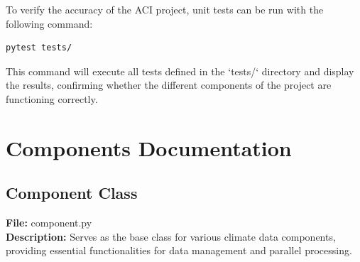 \documentclass[a4paper,12pt]{article}
\begin{document}
To verify the accuracy of the ACI project, unit tests can be run with the following command:

\begin{lstlisting}[language=bash]
pytest tests/
\end{lstlisting}

This command will execute all tests defined in the `tests/` directory and display the results, confirming whether the different components of the project are functioning correctly.

\section{Components Documentation}
\label{sec:api-documentation-detailed}

\subsection{Component Class}
\label{subsec:component-class}
\textbf{File:} component.py \\
\textbf{Description:} Serves as the base class for various climate data components, providing essential functionalities for data management and parallel processing.
\end{document}
